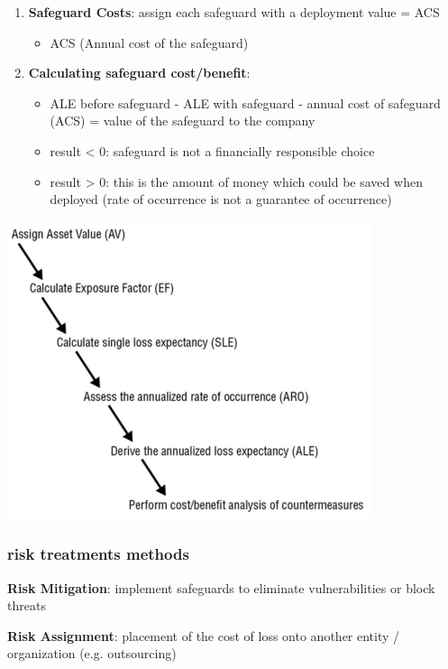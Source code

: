 \documentclass[11pt,twoside,landscape]{article}
\begin{document}
\begin{multicols}{4}
\begin{enumerate}
\item \textbf{Safeguard Costs}: assign each safeguard with a deployment value = ACS
\begin{itemize}
\item ACS (Annual cost of the safeguard)
\end{itemize}

\item \textbf{Calculating safeguard cost/benefit}:
\begin{itemize}
\item ALE before safeguard - ALE with safeguard - annual cost of safeguard (ACS) = value of the safeguard to the company
\item result < 0: safeguard is not a financially responsible choice
\item result > 0: this is the amount of money which could be saved when deployed (rate of occurrence is not a guarantee of occurrence)
\end{itemize}
\end{enumerate}

\begin{center}
\includegraphics[width=.9\linewidth]{img/quantitative_risk_analysis.png}
\end{center}

\subsubsection*{risk treatments methods}
\label{sec:org1a25ae6}
\textbf{Risk Mitigation}: implement safeguards to eliminate vulnerabilities or block threats

\textbf{Risk Assignment}: placement of the cost of loss onto another entity / organization (e.g. outsourcing)


\end{multicols}
\end{document}
